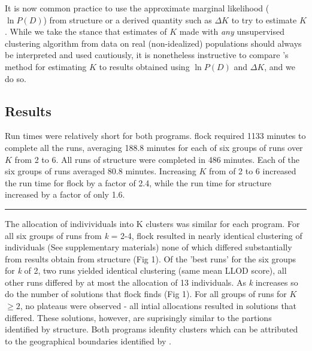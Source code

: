 It is now common practice to use the approximate marginal likelihood ($\ln P(D)$) from {\sc structure}
or a derived quantity such as $\Delta K$ \citep{Evannoetal2005} to try to estimate $K$.
While we take the stance that estimates of $K$ made with {\em any} unsupervised clustering algorithm
from data on real (non-idealized) populations should always be interpreted and used
cautiously, it is nonetheless instructive to compare \citet{Duc&Tur2012}'s method for
estimating $K$ to results obtained using $\ln P(D)$ and $\Delta K$, and we do so. 


\subsection*{Results} 
Run times were relatively short for both programs. {\sc flock} 
required 1133 minutes to complete all the runs, averaging 188.8 minutes for 
each of six groups of runs over $K$ from 2 to 6. All runs of {\sc structure} were completed in 
486 minutes. Each of the six groups of runs averaged 80.8 minutes. Increasing
$K$ from of 2 to 6 increased the run time for {\sc flock} by a factor of 2.4, while the run time 
for {\sc structure} increased by a factor of only 1.6.
\hrule

The allocation of indivividuals into K clusters was similar for each program. For all six groups 
of runs from \textit{k} = 2-4, {\sc flock} resulted in nearly identical clustering of individuals 
(See supplementary materials) none of which differed substantially from results obtain from 
{\sc structure} (Fig 1). Of the 'best runs' for the six groups for \textit{k} of 2, two  
runs yielded identical clustering (same mean LLOD score), all other runs 
differed by at most the allocation of 13 individuals. As 
\textit{k} increases so do the number of solutions
that {\sc flock} finds (Fig 1). For all groups of runs for $K$ $\geq 2$, no plateaus were observed - all intial 
allocations resulted in solutions that differed. These solutions, however, are suprisingly similar to
 the partions identified by {\sc structure}. Both programs idenfity clusters 
which can be attributed to the geographical boundaries identified by \citet{Garzaetal_norcal}.

